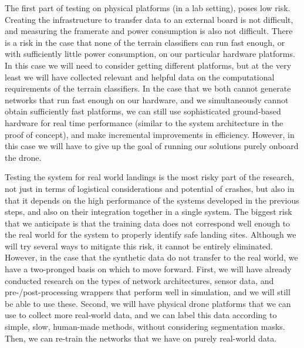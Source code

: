 The first part of testing on physical platforms (in a lab setting), poses low risk.
Creating the infrastructure to transfer data to an external board is not difficult,
and measuring the framerate and power consumption is also not difficult.
There is a risk in the case that none of the terrain classifiers can run fast enough,
or with sufficiently little power consumption, on our particular hardware platforms.
In this case we will need to consider getting different platforms, but at the very least we will
have collected relevant and helpful data on the computational requirements of the terrain classifiers.
In the case that we both cannot generate networks that run fast enough on our hardware,
and we simultaneously cannot obtain sufficiently fast platforms,
we can still use sophisticated ground-based hardware for real time performance
(similar to the system architecture in the proof of concept),
and make incremental improvements in efficiency.
However, in this case we will have to give up the goal of running our solutions purely onboard the drone.

Testing the system for real world landings is the most risky part of the research,
not just in terms of logistical considerations and potential of crashes,
but also in that it depends on the high performance of the systems developed in the previous steps,
and also on their integration together in a single system.
The biggest risk that we anticipate is that the training data does not correspond well enough to the
real world for the system to properly identify safe landing sites.
Although we will try several ways to mitigate this risk, it cannot be entirely eliminated.
However, in the case that the synthetic data do not transfer to the real world,
we have a two-pronged basis on which to move forward.
First, we will have already conducted research on the types of network architectures,
sensor data, and pre-/post-processing wrappers that perform well in simulation,
and we will still be able to use these.
Second, we will have physical drone platforms that we can use to collect more real-world data,
and we can label this data according to simple, slow, human-made methods,
without considering segmentation masks.
Then, we can re-train the networks that we have on purely real-world data.